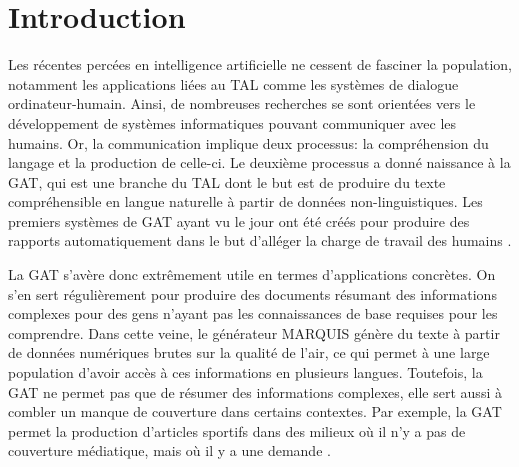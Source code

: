 
\chapter*{Introduction}



Les récentes percées en intelligence artificielle ne cessent de fasciner la population, notamment les applications liées au \acf{TAL} comme les systèmes de dialogue ordinateur-humain. Ainsi, de nombreuses recherches se sont orientées vers le développement de systèmes informatiques pouvant communiquer avec les humains. Or, la communication implique deux processus: la compréhension du langage et la production de celle-ci. Le deuxième processus a donné naissance à la \acf{GAT}, qui est une branche du \ac{TAL} dont le but est de produire du texte compréhensible en langue naturelle à partir de données non-linguistiques. Les premiers systèmes de \ac{GAT} ayant vu le jour ont été créés pour produire des rapports automatiquement dans le but d'alléger la charge de travail des humains \citep{ReiterBuildingNaturalLanguage2000}.

La \ac{GAT} s'avère donc extrêmement utile en termes d'applications concrètes. On s'en sert régulièrement pour produire des documents résumant des informations complexes pour des gens n'ayant pas les connaissances de base requises pour les comprendre. Dans cette veine, le générateur MARQUIS \citep{WannerMARQUISGENERATIONUSERTAILORED2010} génère du texte à partir de données numériques brutes sur la qualité de l'air, ce qui permet à une large population d'avoir accès à ces informations en plusieurs langues. Toutefois, la \ac{GAT} ne permet pas que de résumer des informations complexes, elle sert aussi à combler un manque de couverture dans certains contextes. Par exemple, la \ac{GAT} permet la production d'articles sportifs dans des milieux où il n'y a pas de couverture médiatique, mais où il y a une demande \citep{lareau11a,W17-3513}.

